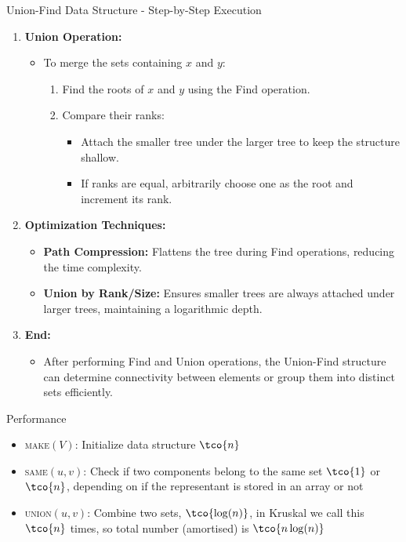 \begin{usage}[]{Union-Find Data Structure - Step-by-Step Execution}
\begin{enumerate}
        \item \textbf{Union Operation:}
              \begin{itemize}
                  \item To merge the sets containing \(x\) and \(y\):
                        \begin{enumerate}
                            \item Find the roots of \(x\) and \(y\) using the Find operation.
                            \item Compare their ranks:
                                  \begin{itemize}
                                      \item Attach the smaller tree under the larger tree to keep the structure shallow.
                                      \item If ranks are equal, arbitrarily choose one as the root and increment its rank.
                                  \end{itemize}
                        \end{enumerate}
              \end{itemize}

        \item \textbf{Optimization Techniques:}
              \begin{itemize}
                  \item \textbf{Path Compression:} Flattens the tree during Find operations, reducing the time complexity.
                  \item \textbf{Union by Rank/Size:} Ensures smaller trees are always attached under larger trees, maintaining a logarithmic depth.
              \end{itemize}

        \item \textbf{End:}
              \begin{itemize}
                  \item After performing Find and Union operations, the Union-Find structure can determine connectivity between elements or group them into distinct sets efficiently.
              \end{itemize}
    \end{enumerate}
\end{usage}

\begin{properties}[]{Performance}
    \begin{itemize}
        \item \textsc{make}$(V)$: Initialize data structure $\tco{n}$
        \item \textsc{same}$(u, v)$: Check if two components belong to the same set $\tco{1}$ or $\tco{n}$, depending on if the representant is stored in an array or not
        \item \textsc{union}$(u, v)$: Combine two sets, $\tco{\log(n)}$, in Kruskal we call this $\tco{n}$ times, so total number (amortised) is $\tco{n \log(n)}$
    \end{itemize}
\end{properties}
